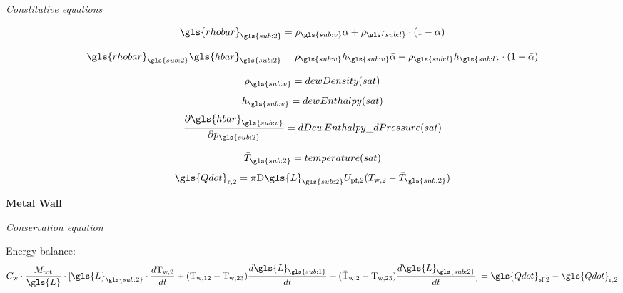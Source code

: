 \begin{center}
\textit{Constitutive equations}
\end{center}
\begin{equation}
\gls{rhobar}_{\gls{sub:2}} = \rho_{\gls{sub:v}} \bar{\alpha} + \rho_{\gls{sub:l}} \cdot (1 - \bar{\alpha})
\end{equation}

\begin{equation}
\gls{rhobar}_{\gls{sub:2}} \gls{hbar}_{\gls{sub:2}}= \rho_{\gls{sub:v}} h_{\gls{sub:v}} \bar{\alpha} + \rho_{\gls{sub:l}} h_{\gls{sub:l}} \cdot (1 - \bar{\alpha})
\end{equation}

\begin{equation}
\rho_{\gls{sub:v}} = dewDensity(sat)
\end{equation}
\begin{equation}
h_{\gls{sub:v}} = dewEnthalpy(sat)
\end{equation}
\begin{equation}
\frac{\partial \gls{hbar}_{\gls{sub:v}}}{\partial p_{\gls{sub:2}}}= dDewEnthalpy\_dPressure(sat)
\end{equation}

\begin{equation}
\bar{T}_{\gls{sub:2}} = temperature(sat)
\end{equation}
\begin{equation}
\gls{Qdot}_\text{r,2} = \pi \text{D} \gls{L}_{\gls{sub:2}} U_\text{pf,2} (T_\text{w,2} - \bar{T}_{\gls{sub:2}})
\end{equation}


\begin{flushleft}
{\bf Metal Wall}\\
\end{flushleft}
\begin{center}
\textit{Conservation equation}
\end{center}
Energy balance:\\
\begin{equation}
C_\text{w} \cdot \frac{M_\text{tot}}{\gls{L}} \cdot [\gls{L}_{\gls{sub:2}} \cdot  \frac{d \text{T}_\text{w,2}}{d t} +  (\text{T}_\text{w,12} - \text{T}_\text{w,23})  \frac{d \gls{L}_{\gls{sub:1}}}{d t} +  (\bar{\text{T}}_\text{w,2} - \text{T}_\text{w,23})  \frac{d \gls{L}_{\gls{sub:2}}}{d t}] = \gls{Qdot}_\text{sf,2} - \gls{Qdot}_\text{r,2}
\end{equation}



